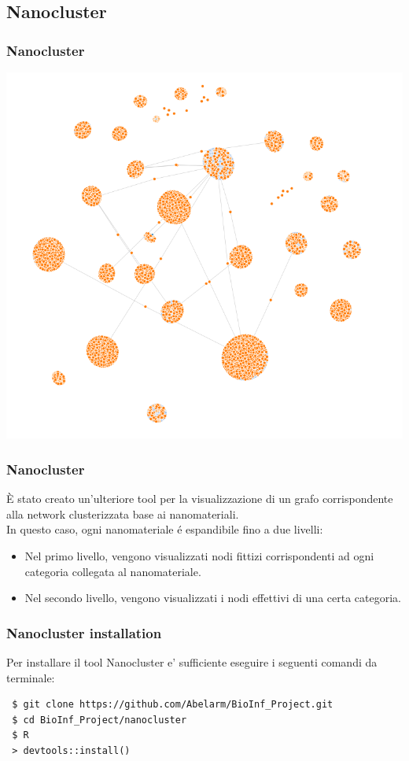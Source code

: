 \documentclass{beamer}
\begin{document}
\subsection{Nanocluster}

\begin{frame}
\frametitle{Nanocluster}
\begin{center}
\includegraphics[scale=0.27]{img/nano_cluster_network.png} 
\end{center}
\end{frame}

\begin{frame}
\frametitle{Nanocluster}
È stato creato un'ulteriore tool per la visualizzazione di un grafo corrispondente alla network clusterizzata base ai nanomateriali.\\
\medskip
In questo caso, ogni nanomateriale \'e espandibile fino a due livelli:
\begin{itemize}
	\item Nel primo livello, vengono visualizzati nodi fittizi corrispondenti ad ogni categoria collegata al nanomateriale. 
	\item Nel secondo livello, vengono visualizzati i nodi effettivi di una certa categoria.
\end{itemize}
\end{frame}



\begin{frame}[fragile]
\frametitle{Nanocluster installation}
Per installare il tool Nanocluster e' sufficiente eseguire i seguenti comandi da terminale:
\begin{footnotesize}
\begin{lstlisting}
 $ git clone https://github.com/Abelarm/BioInf_Project.git
 $ cd BioInf_Project/nanocluster
 $ R
 > devtools::install()
\end{lstlisting}
\end{footnotesize}
\end{frame}
\end{document}
